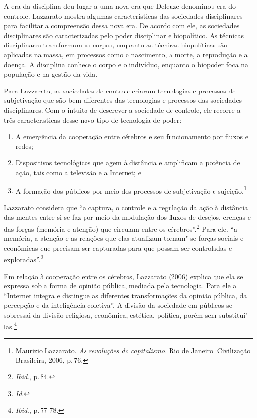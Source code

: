 A era da disciplina deu lugar a uma nova era que Deleuze denominou era
do controle. Lazzarato mostra algumas características das
sociedades disciplinares para facilitar a compreensão dessa nova era. De
acordo com ele, as sociedades disciplinares são caracterizadas pelo
poder disciplinar e biopolítico. As técnicas disciplinares transformam
os corpos, enquanto as técnicas biopolíticas são aplicadas na massa, em
processos como o nascimento, a morte, a reprodução e a doença. A
disciplina conhece o corpo e o indivíduo, enquanto o biopoder foca na
população e na gestão da vida.

Para Lazzarato, as sociedades de controle criaram tecnologias e
processos de subjetivação que são bem diferentes das tecnologias e
processos das sociedades disciplinares. Com o intuito de descrever a
sociedade de controle, ele recorre a três características desse novo
tipo de tecnologia de poder: 

\begin{enumerate}
\item A emergência da cooperação entre
cérebros e seu funcionamento por fluxos e redes;

\item Dispositivos
tecnológicos que agem à distância e amplificam a potência de ação, tais
como a televisão e a Internet; e 

\item A formação dos públicos por meio dos
processos de subjetivação e sujeição.\footnote{Maurizio Lazzarato. \emph{As revoluções do capitalismo.} Rio de Janeiro: Civilização Brasileira, 2006, p.\,76.}
\end{enumerate}

Lazzarato considera que ``a captura, o controle e a regulação da
ação à distância das mentes entre si se faz por meio da modulação dos
fluxos de desejos, crenças e das forças (memória e atenção) que circulam
entre os cérebros''.\footnote{\textit{Ibid}., p.\,84.} Para ele, ``a memória, a atenção e as
relações que elas atualizam tornam"-se forças sociais e econômicas que
precisam ser capturadas para que possam ser controladas e exploradas''.\footnote{\textit{Id}.}

Em relação à cooperação entre os cérebros, Lazzarato (2006) explica que
ela se expressa sob a forma de opinião pública, mediada pela tecnologia.
Para ele a ``Internet integra e distingue as diferentes transformações
da opinião pública, da percepção e da inteligência coletiva''. A divisão
da sociedade em públicos se sobressai da divisão religiosa, econômica,
estética, política, porém sem substituí"-las.\footnote{\textit{Ibid}., p.\,77-78.}

